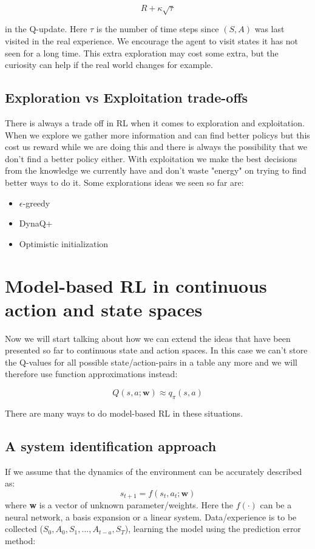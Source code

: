 	\begin{equation}
		R + \kappa \sqrt{\tau}
	\end{equation}

in the Q-update. Here $\tau$ is the number of time steps since $(S,A)$ was last visited in the real experience. We encourage the agent to visit states it has not seen for a long time. This extra exploration may cost some extra, but the curiosity can help if the real world changes for example.

\subsection{Exploration vs Exploitation trade-offs}
There is always a trade off in RL when it comes to exploration and exploitation. When we explore we gather more information and can find better policys but this cost us reward while we are doing this and there is always the possibility that we don't find a better policy either. With exploitation we make the best decisions from the knowledge we currently have and don't waste "energy" on trying to find better ways to do it. Some explorations ideas we seen so far are:

\begin{itemize}
	\item $\epsilon$-greedy
	\item  DynaQ+
	\item Optimistic initialization
\end{itemize}

\section{Model-based RL in continuous action and state spaces}
Now we will start talking about how we can extend the ideas that have been presented so far to continuous state and action spaces. In this case we can't store the Q-values for all possible state/action-pairs in a table any more and we will therefore use function approximations instead:

	\begin{equation}
	 	Q(s,a;\textbf{w}) \approx q_\pi(s,a)
	 \end{equation} 

There are many ways to do model-based RL in these situations. 

\subsection{A system identification approach}
If we assume that the dynamics of the environment can be accurately described as: 
	\begin{equation}
		s_{t+1} = f(s_t, a_t;\textbf{w})
	\end{equation}
where \textbf{w} is a vector of unknown parameter/weights. Here the $f(\cdot)$ can be a neural network, a basis expansion or a linear system. Data/experience is to be collected ($S_0,A_0,S_1,\ldots,A_{t-a},S_T$), learning the model using the prediction error method:

